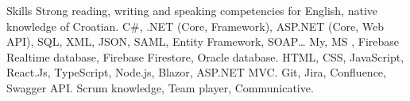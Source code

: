 
\begin{rubric}{Skills}
	\entry*[Languages]
	Strong reading, writing and speaking competencies for English, native knowledge of Croatian.
	C\#, .NET (Core, Framework), ASP.NET (Core, Web API), SQL, XML, JSON, SAML, Entity Framework, SOAP\ldots
	\entry*[Databases]
	My, MS  , Firebase Realtime database, Firebase Firestore, Oracle database.
	HTML, CSS, JavaScript, React.Js, TypeScript, Node.js, Blazor, ASP.NET MVC.
	\entry*[Tools.]
	Git, Jira, Confluence, Swagger API.
	\entry*[Misc.]
	Scrum knowledge, Team player, Communicative.
\end{rubric}
